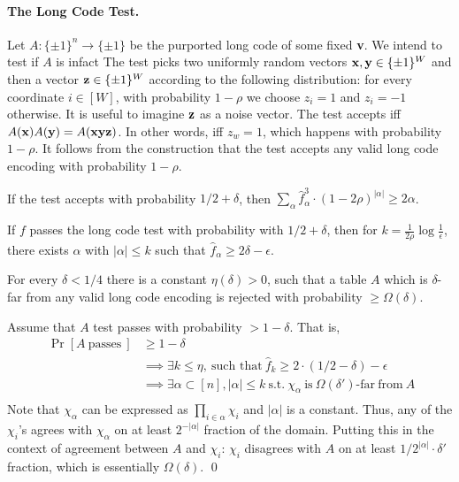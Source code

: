 \paragraph{The Long Code Test.}\label{LC} Let $A : \{ \pm 1\}^n \rightarrow \{\pm 1\}$ be
the purported long code of some fixed {\bf v}. We intend to test if
$A$ is infact The test picks two uniformly random vectors ${\bf x,y}
\in \{\pm1\}^W$ and then a vector ${\bf z} \in \{\pm1\}^W$ according
to the following distribution: for every coordinate $i \in [W]$, with
probability $1 - \rho$ we choose $z_i = 1$ and $z_i = -1$ otherwise.
It is useful to imagine ${\bf z}$ as a noise vector. The test accepts
iff $A({\bf x}) A({\bf y}) = A({\bf xyz})$. In other words, iff $z_w =
1$, which happens with probability $1 - \rho$. It follows from the
construction that the test accepts any valid long code encoding with
probability $1 - \rho$.

\begin{lemma}
If the test accepts with probability $1/2 + \delta$, then 
$\sum_\alpha \hat{f}^3_\alpha \cdot (1 - 2\rho)^{|\alpha|} \ge 2\alpha$.
\end{lemma}

\begin{corollary}
  If $f$ passes the long code test with probability with $1/2 +
  \delta$, then for $k = \frac{1}{2\rho}\log\frac{1}{\epsilon}$, there
  exists $\alpha$ with $|\alpha| \le k$ such that $\hat{f}_\alpha \ge
  2\delta - \epsilon$.
\end{corollary}

\begin{lemma}\label{longcode}
  For every $\delta < 1/4$ there is a constant $\eta(\delta) > 0$,
  such that a table $A$ which is $\delta$-far from any valid long code
  encoding is rejected with probability $\ge \Omega(\delta)$.
\end{lemma}
  Assume that $A$ test passes with probability
$> 1 - \delta$. That is,
\begin{align*}
\	   \Pr \left [A\ \mbox{passes}\ \right]  &\ge 1 - \delta \\
& \implies  \exists k \le \eta,\  \mbox{such that} \ \hat{f}_k \ge 2 \cdot (1/2 -\delta ) - \epsilon \\
 &\implies  \exists \alpha \subset [n],  |\alpha|  \le k \  \mbox{s.t.}\  \chi_\alpha \  \mbox{is}\  \Omega(\delta')\mbox{-far}\ \mbox{from}\  A \\
 \end{align*}
 Note that $\chi_\alpha$ can be expressed as $\prod_{i \in \alpha}
 \chi_i$ and $|\alpha|$ is a constant.  Thus, any of the $\chi_i$'s
 agrees with $\chi_\alpha$ on at least $2^{-|\alpha|}$ fraction of the
 domain. Putting this in the context of agreement between $A$ and
 $\chi_i$: $\chi_i$ disagrees with $A$ on at least $1/2^{|\alpha|}
 \cdot \delta'$ fraction, which is essentially $\Omega(\delta)$. \qed

